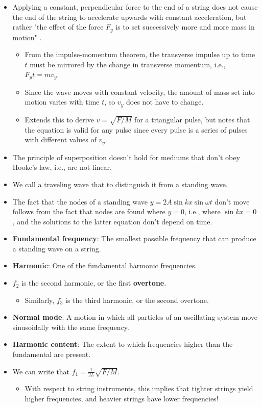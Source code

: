\documentclass[../notes.tex]{subfiles}
\begin{document}
\begin{itemize}
\begin{itemize}
\begin{equation*}
        \end{equation*}
    \end{itemize}
    \item Applying a constant, perpendicular force to the end of a string does not cause the end of the string to accelerate upwards with constant acceleration, but rather "the effect of the force $F_y$ is to set successively more and more mass in motion" \parencite[475]{bib:YoungFreedman}.
    \begin{itemize}
        \item From the impulse-momentum theorem, the transverse impulse up to time $t$ must be mirrored by the change in transverse momentum, i.e., $F_yt=mv_y$.
        \item Since the wave moves with constant velocity, the amount of mass set into motion varies with time $t$, so $v_y$ does not have to change.
        \item Extends this to derive $v=\sqrt{F/M}$ for a triangular pulse, but notes that the equation is valid for any pulse since every pulse is a series of pulses with different values of $v_y$.
    \end{itemize}
    \item The principle of superposition doesn't hold for mediums that don't obey Hooke's law, i.e., are not linear.
    \item We call a traveling wave that to distinguish it from a standing wave.
    \item The fact that the nodes of a standing wave $y=2A\sin kx\sin\omega t$ don't move follows from the fact that nodes are found where $y=0$, i.e., where $\sin kx=0$, and the solutions to the latter equation don't depend on time.
    \item \textbf{Fundamental frequency}: The smallest possible frequency that can produce a standing wave on a string.
    \item \textbf{Harmonic}: One of the fundamental harmonic frequencies.
    \item $f_2$ is the second harmonic, or the first \textbf{overtone}.
    \begin{itemize}
        \item Similarly, $f_3$ is the third harmonic, or the second overtone.
    \end{itemize}
    \item \textbf{Normal mode}: A motion in which all particles of an oscillating system move sinusoidally with the same frequency.
    \item \textbf{Harmonic content}: The extent to which frequencies higher than the fundamental are present.
    \item We can write that $f_1=\frac{1}{2L}\sqrt{F/M}$.
    \begin{itemize}
        \item With respect to string instruments, this implies that tighter strings yield higher frequencies, and heavier strings have lower frequencies!
    \end{itemize}
\end{itemize}
\end{document}

